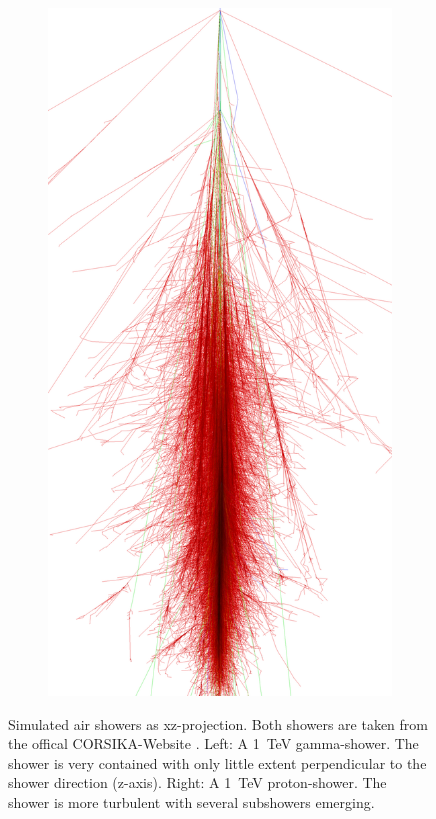 \begin{figure}
\begin{subfigure}{.5\textwidth}
		\includegraphics[width=.9\linewidth]{images/corsika_1tev_proton.png}
	\end{subfigure}
	\caption{Simulated air showers as xz-projection.
		Both showers are taken from the offical 
		CORSIKA-Website \cite{corsika_showers}.
		Left: A \SI{1}{\tera\electronvolt} gamma-shower.
		The shower is very contained with only little extent perpendicular 
		to the shower direction (z-axis).
		Right: A \SI{1}{\tera\electronvolt} proton-shower.
		The shower is more turbulent with several subshowers emerging.
		}
	\label{fig:shower_cleaning}
\end{figure}


